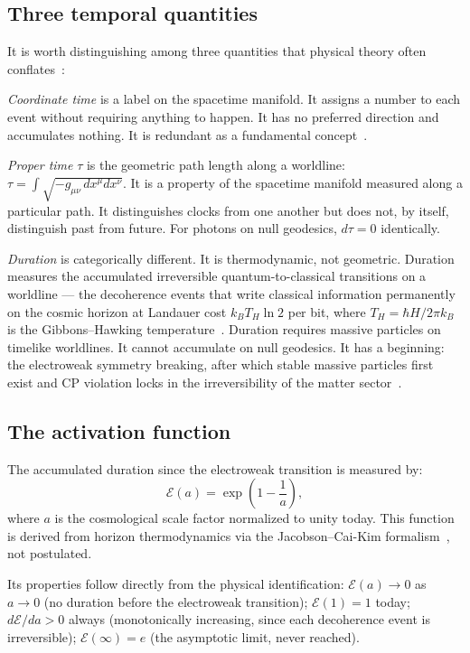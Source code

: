 \documentclass[12pt,a4paper]{article}
\begin{document}
\subsection{Three temporal quantities}

It is worth distinguishing among three quantities that physical theory
often conflates~\citep{IAM_time}:

\textit{Coordinate time} is a label on the spacetime manifold. It assigns
a number to each event without requiring anything to happen. It has no
preferred direction and accumulates nothing. It is redundant as a
fundamental concept~\citep{BarbourBertotti1982}.

\textit{Proper time} $\tau$ is the geometric path length along a worldline:
$\tau = \int \sqrt{-g_{\mu\nu}\,dx^\mu dx^\nu}$. It is a property of the
spacetime manifold measured along a particular path. It distinguishes clocks
from one another but does not, by itself, distinguish past from future.
For photons on null geodesics, $d\tau = 0$ identically.

\textit{Duration} is categorically different. It is thermodynamic, not
geometric. Duration measures the accumulated irreversible
quantum-to-classical transitions on a worldline --- the decoherence events
that write classical information permanently on the cosmic horizon at
Landauer cost $k_B T_H \ln 2$ per bit, where $T_H = \hbar H / 2\pi k_B$
is the Gibbons--Hawking temperature~\citep{Gibbons1977}. Duration requires
massive particles on timelike worldlines. It cannot accumulate on null
geodesics. It has a beginning: the electroweak symmetry breaking, after
which stable massive particles first exist and CP violation locks in the
irreversibility of the matter sector~\citep{Sakharov1967}.

\subsection{The activation function}

The accumulated duration since the electroweak transition is measured by:
\begin{equation}
\mathcal{E}(a) = \exp\!\left(1 - \frac{1}{a}\right),
\label{eq:Ea}
\end{equation}
where $a$ is the cosmological scale factor normalized to unity today.
This function is derived from horizon thermodynamics via the Jacobson--Cai-Kim
formalism~\citep{Jacobson1995,CaiKim2005}, not postulated.

Its properties follow directly from the physical identification:
$\mathcal{E}(a) \to 0$ as $a \to 0$ (no duration before the electroweak
transition); $\mathcal{E}(1) = 1$ today; $d\mathcal{E}/da > 0$ always
(monotonically increasing, since each decoherence event is irreversible);
$\mathcal{E}(\infty) = e$ (the asymptotic limit, never reached).
\end{document}
